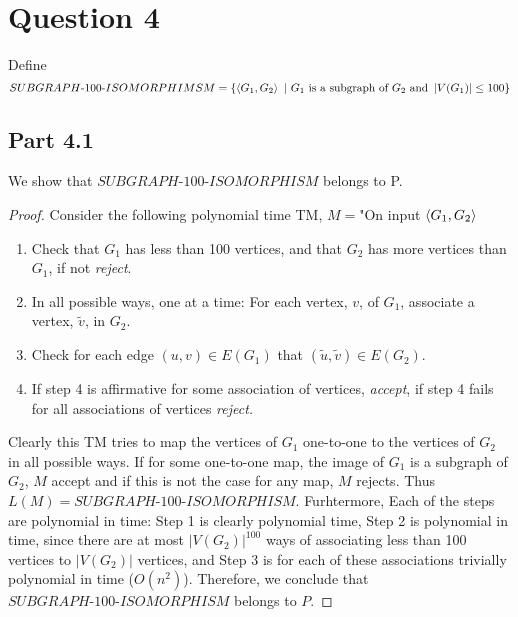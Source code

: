 \documentclass[a4paper,11pt]{article}
\newcommand{\abs}[1]{\left\lvert #1 \right\rvert}
\newcommand{\pipe}{\ \vert \ }
\newcommand{\tm}{\text{-}}
\numberwithin{equation}{section}
\begin{document}
	\section*{Question 4}
	Define \begin{equation*}
		SUBGRAPH\tm 100\tm ISOMORPHIMSM=\{\braket{G_1,G_2}\pipe G_1\text{ is a subgraph of $ G_2 $ and }\abs{V(G_1)}\leq100\} 
	\end{equation*}
	\subsection*{Part 4.1}
	We show that $ SUBGRAPH\tm 100\tm ISOMORPHISM $ belongs to P.
	\begin{proof}
		Consider the following polynomial time TM, $ M= $"On input $ \braket{G_1,G_2} $\begin{enumerate}
			\item Check that $ G_1 $ has less than 100 vertices, and that $ G_2 $ has more vertices than $ G_1 $, if not \emph{reject}.
			\item In all possible ways, one at a time: For each vertex, $ v $, of $ G_1 $, associate a vertex, $ \tilde{v} $, in $ G_2 $. 
			\item \qquad  Check for each edge $ (u,v)\in E(G_1) $ that $ (\tilde{u},\tilde{v})\in E(G_2) $.
			\item If step 4 is affirmative for some association of vertices, \emph{accept}, if step 4 fails for all associations of vertices \emph{reject.}
		\end{enumerate}
		Clearly this TM tries to map the vertices of $ G_1 $ one-to-one to the vertices of $ G_2 $ in all possible ways. If for some one-to-one map, the image of $ G_1 $ is a subgraph of $ G_2 $, $ M $ accept and if this is not the case for any map, $ M $ rejects. Thus $ L(M)=SUBGRAPH\tm 100\tm ISOMORPHISM $. Furhtermore, Each of the steps are polynomial in time: Step 1 is clearly polynomial time, Step 2 is polynomial in time, since there are at most $ \abs{V(G_2)}^{100} $ ways of associating less than 100 vertices to $ \abs{V(G_2)} $ vertices, and Step 3 is for each of these associations trivially polynomial in time ($ O(n^2) $). Therefore, we conclude that $ SUBGRAPH\tm 100\tm ISOMORPHISM $ belongs to $ P $.
	\end{proof}
	
\end{document}
